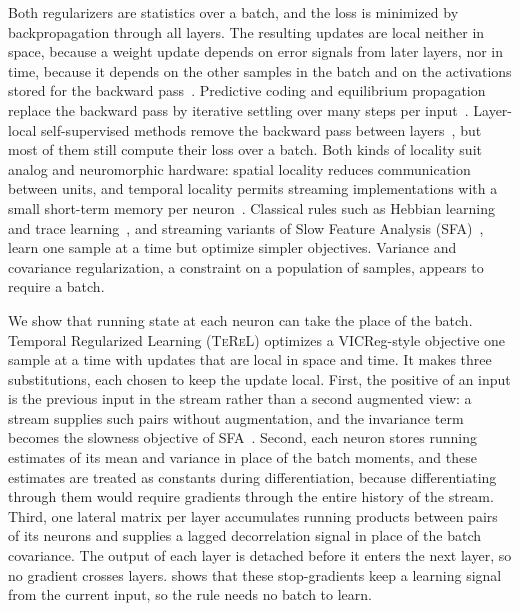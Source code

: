 \documentclass[11pt]{article}
\newcommand{\TeReL}{\textsc{TeReL}}
\begin{document}
Both regularizers are statistics over a batch, and the loss is minimized by
backpropagation through all layers. The resulting updates are local neither
in space, because a weight update depends on error signals from later layers,
nor in time, because it depends on the other samples in the batch and on the
activations stored for the backward pass~\cite{rumelhart1986}. Predictive
coding and equilibrium propagation replace the backward pass by iterative
settling over many steps per input~\cite{rao1999,scellier2017}. Layer-local
self-supervised methods remove the backward pass between
layers~\cite{lowe2019,xiong2020,illing2021,siddiqui2024,datta2025}, but most
of them still compute their loss over a batch. Both kinds of locality suit
analog and neuromorphic hardware: spatial locality reduces communication between
units, and temporal locality permits streaming implementations with a small
short-term memory per neuron~\cite{indiveri2015,davies2018}. Classical rules
such as Hebbian learning~\cite{oja1982} and trace
learning~\cite{foldiak1991}, and streaming variants of Slow Feature Analysis
(SFA)~\cite{kompella2012,lipshutz2020}, learn one sample at a time but
optimize simpler objectives. Variance and
covariance regularization, a constraint on a population of samples, appears to
require a batch.

We show that running state at each neuron can take the place of the batch.
Temporal Regularized Learning (\TeReL{}) optimizes a VICReg-style objective one
sample at a time with updates that are local in space and time. It makes three
substitutions, each chosen to keep the update local. First, the positive of an
input is the previous input in the stream rather than a second augmented view:
a stream supplies such pairs without augmentation, and the invariance term
becomes the slowness objective of SFA~\cite{wiskott2002}. Second, each neuron
stores running estimates of its mean and variance in place of the batch
moments, and these estimates are treated as constants during differentiation,
because differentiating through them would require gradients through the
entire history of the stream. Third, one lateral matrix per layer accumulates
running products between pairs of its neurons and supplies a lagged
decorrelation signal in place of the batch covariance. The output of each
layer is detached before it enters the next layer, so no gradient crosses
layers.  shows that these stop-gradients keep a
learning signal from the current input, so the rule needs no batch to learn.
\end{document}
